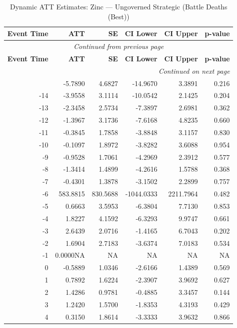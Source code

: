 \begin{longtable}{rrrrrr}
\caption{Dynamic ATT Estimates: Zinc --- Ungoverned Strategic (Battle Deaths (Best))} \label{tab:zinc_battle_deaths_best_} \\
\toprule
\textbf{Event Time} & \textbf{ATT} & \textbf{SE} & \textbf{CI Lower} & \textbf{CI Upper} & \textbf{p-value} \\
\midrule
\endfirsthead
\multicolumn{6}{c}{\textit{Continued from previous page}} \\
\toprule
\textbf{Event Time} & \textbf{ATT} & \textbf{SE} & \textbf{CI Lower} & \textbf{CI Upper} & \textbf{p-value} \\
\midrule
\endhead
\midrule \multicolumn{6}{r}{\textit{Continued on next page}} \\
\endfoot
\bottomrule
\endlastfoot
-15 & -5.7890 & 4.6827 & -14.9670 & 3.3891 & 0.216 \\
-14 & -3.9558 & 3.1114 & -10.0542 & 2.1425 & 0.204 \\
-13 & -2.3458 & 2.5734 & -7.3897 & 2.6981 & 0.362 \\
-12 & -1.3967 & 3.1736 & -7.6168 & 4.8235 & 0.660 \\
-11 & -0.3845 & 1.7858 & -3.8848 & 3.1157 & 0.830 \\
-10 & -0.1097 & 1.8972 & -3.8282 & 3.6088 & 0.954 \\
-9 & -0.9528 & 1.7061 & -4.2969 & 2.3912 & 0.577 \\
-8 & -1.3414 & 1.4899 & -4.2616 & 1.5788 & 0.368 \\
-7 & -0.4301 & 1.3878 & -3.1502 & 2.2899 & 0.757 \\
-6 & 583.8815 & 830.5688 & -1044.0333 & 2211.7964 & 0.482 \\
-5 & 0.6663 & 3.5953 & -6.3804 & 7.7130 & 0.853 \\
-4 & 1.8227 & 4.1592 & -6.3293 & 9.9747 & 0.661 \\
-3 & 2.6439 & 2.0716 & -1.4165 & 6.7043 & 0.202 \\
-2 & 1.6904 & 2.7183 & -3.6374 & 7.0183 & 0.534 \\
-1 & 0.0000NA & NA & NA & NA & NA \\
0 & -0.5889 & 1.0346 & -2.6166 & 1.4389 & 0.569 \\
1 & 0.7892 & 1.6224 & -2.3907 & 3.9692 & 0.627 \\
2 & 1.4286 & 0.9781 & -0.4885 & 3.3457 & 0.144 \\
3 & 1.2420 & 1.5700 & -1.8353 & 4.3193 & 0.429 \\
4 & 0.3150 & 1.8614 & -3.3333 & 3.9632 & 0.866 \\

\end{longtable}
